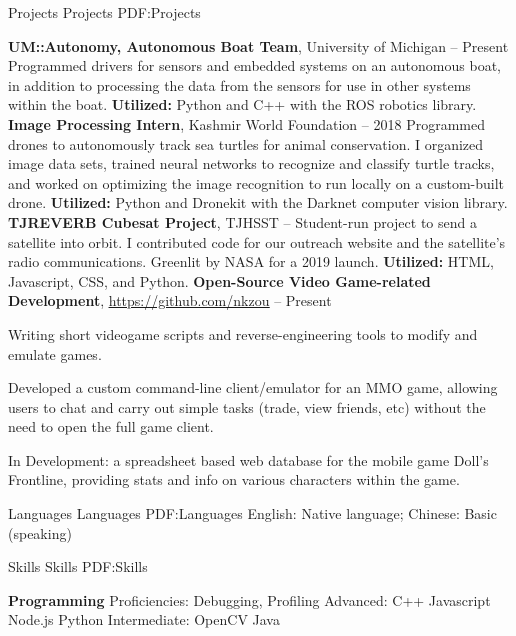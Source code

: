 \documentclass[letterpaper,MMMyyyy,nonstopmode]{style}
\begin{document}
\begin{Body}
\Section
{Projects}
{Projects}
{PDF:Projects}

\Entry
{\textbf{UM::Autonomy, Autonomous Boat Team}}, University of Michigan
\hfill
{} -- Present
\Gap
Programmed drivers for sensors and embedded systems on an autonomous boat, in addition to processing the data from the sensors for use in other systems within the boat. \textbf{Utilized:} Python and C++ with the ROS robotics library.
\Gap
\Entry
{\textbf{Image Processing Intern}}, Kashmir World Foundation
\hfill
{} -- {2018}
\Gap
Programmed drones to autonomously track sea turtles for animal conservation. I organized image data sets, trained neural networks to recognize and classify turtle tracks, and worked on optimizing the image recognition to run locally on a custom-built drone. \textbf{Utilized:} Python and Dronekit with the Darknet computer vision library.
\Gap
\Entry
{\textbf{TJREVERB Cubesat Project}}, TJHSST
\hfill
{} -- 
\Gap
Student-run project to send a satellite into orbit. I contributed code for our outreach website and the satellite's radio communications. Greenlit by NASA for a 2019 launch. \textbf{Utilized:} HTML, Javascript, CSS, and Python.
\Gap
\Entry
{\textbf{Open-Source Video Game-related Development}}, \underline{\href{https://github.com/nkzou}{https://github.com/nkzou}}
\hfill
{} -- Present
\Gap

Writing short videogame scripts and reverse-engineering tools to modify and emulate games.

Developed a custom command-line client/emulator for an MMO game, allowing users to chat and carry out simple tasks (trade, view friends, etc) without the need to open the full game client.

In Development: a spreadsheet based web database for the mobile game Doll's Frontline, providing stats and info on various characters within the game.


\Section
{Languages}
{Languages}
{PDF:Languages}
English: Native language; Chinese: Basic (speaking)


\Section
{Skills}
{Skills}
{PDF:Skills}

\Entry
{\textbf{Programming}}
\Gap
Proficiencies: Debugging, Profiling
\Gap
Advanced:
C++ \SubBulletSymbol \space 
Javascript \SubBulletSymbol \space 
Node.js \SubBulletSymbol \space
Python
\Gap
Intermediate:
OpenCV \SubBulletSymbol \space
Java


\end{Body}
\end{document}
